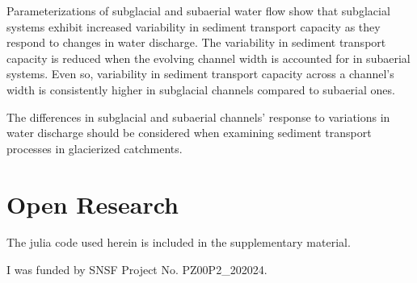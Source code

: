 \documentclass[draft]{agujournal2019}
\begin{document}
Parameterizations of subglacial and subaerial water flow show that subglacial systems exhibit increased variability in sediment transport capacity as they respond  to changes in water discharge.
The variability in sediment transport capacity is reduced when the evolving channel width is accounted for in subaerial systems.
Even so, variability in sediment transport capacity across a channel's width is consistently higher in subglacial channels compared to subaerial ones.

The differences in subglacial and subaerial channels' response to variations in water discharge should be considered when examining sediment transport processes in glacierized catchments.


\section*{Open Research}
\noindent
The julia code used herein is included in the supplementary material.



\acknowledgments
I was funded by SNSF Project No. PZ00P2\_202024.



% 
% 








\end{document}
